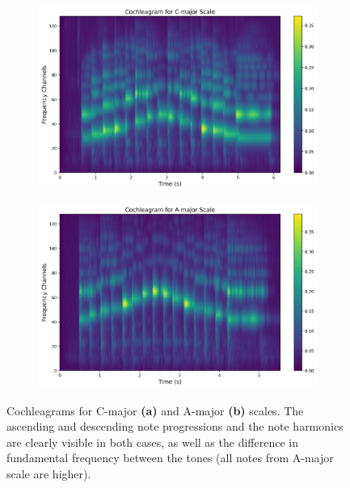 \begin{figure}[t]
	\centering
	\begin{subfigure}{0.5\textwidth}
		\centering
		\includegraphics[width=\linewidth]{include/cochleagram_example_C-major}
		\caption{}
	\end{subfigure}%
	\begin{subfigure}{0.5\textwidth}
		\centering
		\includegraphics[width=\linewidth]{include/cochleagram_example_A-major}
		\caption{}
	\end{subfigure}
	\caption[Comparison of cochleagrams for C-major and A-major scales]{Cochleagrams for C-major \textbf{(a)} and A-major \textbf{(b)} scales. The ascending and descending note progressions and the note harmonics are clearly visible in both cases, as well as the difference in fundamental frequency between the tones (all notes from A-major scale are higher).}
	\label{img:cochleagram_example}
\end{figure}

